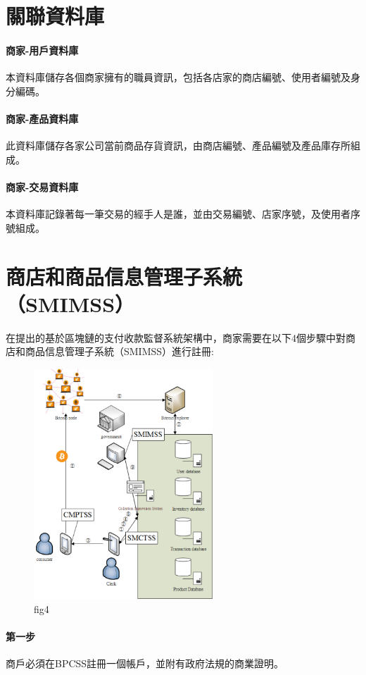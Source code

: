 		\section{關聯資料庫}
		\paragraph{商家-用戶資料庫}本資料庫儲存各個商家擁有的職員資訊，包括各店家的商店編號、使用者編號及身分編碼。
		\paragraph{商家-產品資料庫}此資料庫儲存各家公司當前商品存貨資訊，由商店編號、產品編號及產品庫存所組成。
		\paragraph{商家-交易資料庫}本資料庫記錄著每一筆交易的經手人是誰，並由交易編號、店家序號，及使用者序號組成。

	\section{商店和商品信息管理子系統（SMIMSS）}
	在提出的基於區塊鏈的支付收款監督系統架構中，商家需要在以下4個步驟中對商店和商品信息管理子系統（SMIMSS）進行註冊:

	\begin{figure}[h]
		\centering
		\includegraphics[width = 0.6\textwidth]{fig4.png}
		\caption{fig4}\label{fig4}
	\end{figure}

		\paragraph{第一步}商戶必須在BPCSS註冊一個帳戶，並附有政府法規的商業證明。
